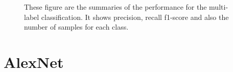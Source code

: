 \begin{figure}
\caption [Performance summary of the Components class trained on Resnet 18]{These figure are the summaries of the performance for the multi-label classification. It shows precision, recall f1-score and also the number of samples for each class.}
\label{fig:perf_res}
\end{figure}



\section{AlexNet}\label{sec:aleX}
